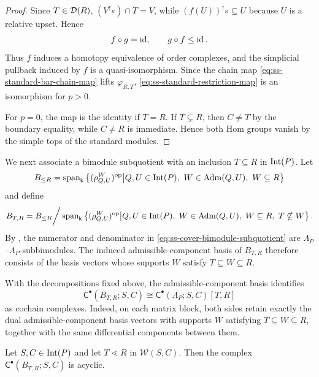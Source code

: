 \begin{proof}
Since $T\in\mathcal D(R)$,
$(V^{\uparrow_R})\cap T=V$, while
$(f(U))^{\uparrow_R}\subseteq U$ because $U$ is a relative upset.
Hence
\begin{equation}
\label{eq:ss-standard-restriction-poset-homotopy}
f\circ g=\operatorname{id},
\qquad
g\circ f\leq\operatorname{id}.
\end{equation}
Thus $f$ induces a homotopy equivalence of order complexes, and the
simplicial pullback induced by $f$ is a quasi-isomorphism.
Since the chain map
\eqref{eq:ss-standard-bar-chain-map} lifts $\varphi_{R,T}$,
\eqref{eq:ss-standard-restriction-map} is an isomorphism for $p>0$.

For $p=0$, the map is the identity if $T=R$.
If $T\subsetneq R$, then $C\neq T$ by the boundary equality, while
$C\neq R$ is immediate.
Hence both Hom groups vanish by the simple tops of the standard
modules.
\end{proof}



We next associate a bimodule subquotient with an inclusion
$T\subseteq R$ in $\operatorname{Int}(P)$.  Let
\[
B_{\leq R}
=
\operatorname{span}_{\mathsf{k}}
\left\{
(\rho_{Q,U}^{W})^{\mathrm{op}}
\middle|
Q,U\in\operatorname{Int}(P),\ W\in\operatorname{Adm}(Q,U),\ W\subseteq R
\right\}
\]
and define
\begin{equation}
\label{eq:ss-cover-bimodule-subquotient}
B_{T,R}
=
B_{\leq R}
\bigg/
\operatorname{span}_{\mathsf{k}}
\left\{
(\rho_{Q,U}^{W})^{\mathrm{op}}
\middle|
Q,U\in\operatorname{Int}(P),\ W\in\operatorname{Adm}(Q,U),\
W\subseteq R,\ T\nsubseteq W
\right\}.
\end{equation}
By , the numerator and
denominator in \eqref{eq:ss-cover-bimodule-subquotient} are
$\Lambda_P$--$\Lambda_P$-subbimodules.  
The induced admissible-component basis of $B_{T,R}$ therefore
consists of the basis vectors whose supports $W$ satisfy
$T\subseteq W\subseteq R$.


With the decompositions fixed above, the admissible-component basis
identifies
\begin{equation}
\label{eq:ss-cover-local-complex}
\mathsf C^\bullet(B_{T,R};S,C)
\cong
\mathsf C^\bullet(\Lambda_P;S,C)[T,R]
\end{equation}
as cochain complexes.  
Indeed, on each matrix block, both sides retain exactly the dual
admissible-component basis vectors with supports $W$ satisfying
$T\subseteq W\subseteq R$, together with the same differential
components between them.

\begin{proposition}
\label{prop:ss-cover-bimodule-acyclicity}
Let $S,C\in\operatorname{Int}(P)$ and let $T\lessdot R$ in
$\mathcal W(S,C)$.  Then the complex
$\mathsf C^\bullet(B_{T,R};S,C)$ is acyclic.
\end{proposition}


